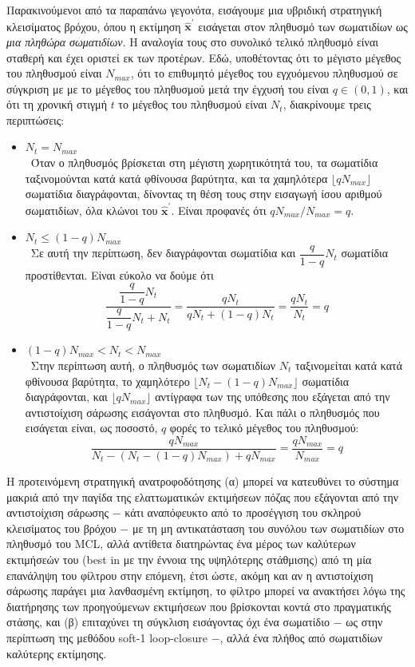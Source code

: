 Παρακινούμενοι από τα παραπάνω γεγονότα, εισάγουμε μια υβριδική στρατηγική κλεισίματος βρόχου, όπου
η εκτίμηση $\hat{\bm{x}}^{\prime}$ εισάγεται στον πληθυσμό των σωματιδίων
ως \textit{μια πληθώρα σωματιδίων}. Η αναλογία τους στο συνολικό τελικό
πληθυσμό είναι σταθερή και έχει οριστεί εκ των προτέρων. Εδώ, υποθέτοντας ότι το μέγιστο
μέγεθος του πληθυσμού είναι $N_{max}$, ότι το επιθυμητό μέγεθος του εγχυόμενου πληθυσμού σε σύγκριση με
με το μέγεθος του πληθυσμού μετά την έγχυσή του είναι $q \in (0,1)$, και ότι τη χρονική στιγμή
$t$ το μέγεθος του πληθυσμού είναι $N_t$, διακρίνουμε τρεις περιπτώσεις:

\begin{itemize}
  \item $N_t = N_{max}$ \\\
        Όταν ο πληθυσμός βρίσκεται στη μέγιστη χωρητικότητά του, τα σωματίδια ταξινομούνται κατά
        κατά φθίνουσα βαρύτητα, και τα χαμηλότερα $\lfloor q N_{max} \rfloor$ σωματίδια
        διαγράφονται, δίνοντας τη θέση τους στην εισαγωγή ίσου αριθμού
        σωματιδίων, όλα κλώνοι του $\hat{\bm{x}}^{\prime}$. Είναι προφανές ότι
        $q N_{max}/N_{max} = q$.
  \item $N_t \leq (1-q) N_{max}$ \\\
        Σε αυτή την περίπτωση, δεν διαγράφονται σωματίδια και $\dfrac{q}{1-q}N_t$
        σωματίδια προστίθενται. Είναι εύκολο να δούμε ότι
        $$\dfrac{\dfrac{q}{1-q}N_t}{\dfrac{q}{1-q}N_t + N_t} = \dfrac{qN_t}{qN_t + (1-q)N_t} = \dfrac{qN_t}{N_t} = q$$
  \item $(1-q) N_{max} < N_t < N_{max}$ \\\
        Στην περίπτωση αυτή, ο πληθυσμός των σωματιδίων $N_t$ ταξινομείται κατά
        κατά φθίνουσα βαρύτητα, το χαμηλότερο $\lfloor N_t - (1-q)N_{max} \rfloor$
        σωματίδια διαγράφονται, και $\lfloor q N_{max} \rfloor$ αντίγραφα των
        της υπόθεσης που εξάγεται από την αντιστοίχιση σάρωσης εισάγονται στο
        πληθυσμό. Και πάλι ο πληθυσμός που εισάγεται είναι, ως ποσοστό,
        $q$ φορές το τελικό μέγεθος του πληθυσμού:
        $$\dfrac{qN_{max}}{N_t - (N_t - (1-q)N_{max}) + qN_{max}} = \dfrac{q N_{max}}{N_{max}} = q$$
\end{itemize}

Η προτεινόμενη στρατηγική ανατροφοδότησης (α) μπορεί να κατευθύνει το σύστημα μακριά από την παγίδα της
ελαττωματικών εκτιμήσεων πόζας που εξάγονται από την αντιστοίχιση σάρωσης $-$ κάτι αναπόφευκτο από το
προσέγγιση του σκληρού κλεισίματος του βρόχου $-$ με τη μη αντικατάσταση του συνόλου των σωματιδίων στο
πληθυσμό του MCL, αλλά αντίθετα διατηρώντας ένα μέρος των καλύτερων εκτιμήσεών του (best in
με την έννοια της υψηλότερης στάθμισης) από τη μία επανάληψη του φίλτρου στην επόμενη, έτσι ώστε,
ακόμη και αν η αντιστοίχιση σάρωσης παράγει μια λανθασμένη εκτίμηση, το φίλτρο μπορεί να ανακτήσει
λόγω της διατήρησης των προηγούμενων εκτιμήσεων που βρίσκονται κοντά στο
πραγματικής στάσης, και (β) επιταχύνει τη σύγκλιση εισάγοντας όχι ένα σωματίδιο $-$ ως
στην περίπτωση της μεθόδου soft-1 loop-closure $-$, αλλά ένα πλήθος από
σωματιδίων καλύτερης εκτίμησης.

